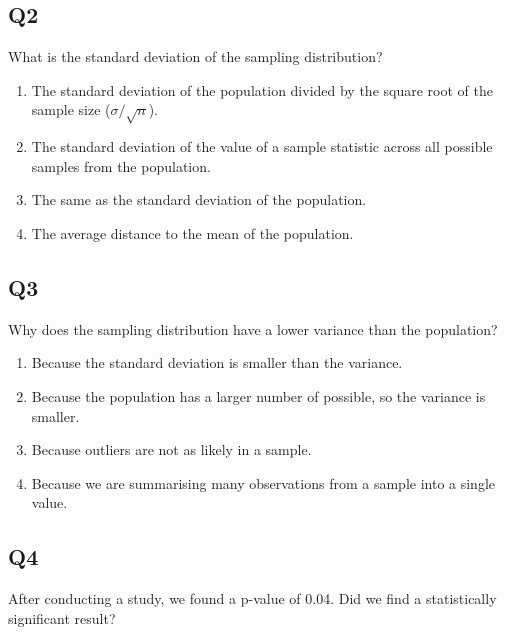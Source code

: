 \documentclass[
  letterpaper,
  DIV=11,
  numbers=noendperiod,
  oneside]{scrreprt}
\providecommand{\tightlist}{%
  \setlength{\itemsep}{0pt}\setlength{\parskip}{0pt}}\usepackage{longtable,booktabs,array}
\begin{document}
\hypertarget{q2-1}{%
\subsection{Q2}\label{q2-1}}

What is the standard deviation of the sampling distribution?

\pspace

\begin{enumerate}
\def\labelenumi{\arabic{enumi}.}
\tightlist
\item
  The standard deviation of the population divided by the square root of
  the sample size (\(\sigma/\sqrt{n}\)).
\item
  The standard deviation of the value of a sample statistic across all
  possible samples from the population.
\item
  The same as the standard deviation of the population.
\item
  The average distance to the mean of the population.
\end{enumerate}

\hypertarget{q3-1}{%
\subsection{Q3}\label{q3-1}}

Why does the sampling distribution have a lower variance than the
population?

\pspace

\begin{enumerate}
\def\labelenumi{\arabic{enumi}.}
\tightlist
\item
  Because the standard deviation is smaller than the variance.
\item
  Because the population has a larger number of possible, so the
  variance is smaller.
\item
  Because outliers are not as likely in a sample.
\item
  Because we are summarising many observations from a sample into a
  single value.
\end{enumerate}

\hypertarget{q4-1}{%
\subsection{Q4}\label{q4-1}}

After conducting a study, we found a p-value of 0.04. Did we find a
statistically significant result?
\end{document}
